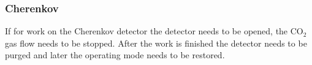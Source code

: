 \begin{safetyen}{0}{0}
\subsubsection{Cherenkov}

If for work on the Cherenkov detector the detector needs to be opened, 
the CO$_2$ gas flow needs to be stopped. After the work is finished the 
detector needs to be purged and later the operating mode needs to be restored.

\end{safetyen}


%

%
